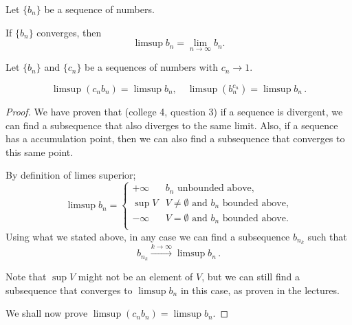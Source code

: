 \documentclass[week=11]{homework}
\date{\today}
\begin{document}
    \maketitle
    \thispagestyle{empty}
    \newpage
    \begin{questions}
		\let\firstquestion\question
		\renewcommand*{\question}{\vspace{7mm}\firstquestion}
        \firstquestion
		Let $\{b_n \}$ be a sequence of numbers. 
		\begin{toprove}
			If $\{b_n \}$ converges, then 
			\[
				\limsup b_n = \lim_{n \to \infty} b_n.
			\]
		\end{toprove}
		
		\question
		Let $\{b_n \}$ and $\{c_n \}$ be a sequences of numbers with $c_n \to 1$. 
		\begin{toprove}
			\[
				\limsup (c_n b_n) = \limsup b_n, \quad \limsup (b_n^{c_n}) = \limsup b_n\,.
			\]
		\end{toprove}
		\begin{proof}
			We have proven that (college 4, question 3) if a sequence is divergent, we can find a subsequence that also diverges to the same limit. Also, if a sequence has a accumulation point, then we can also find a subsequence that converges to this same point.
			
			By definition of limes superior;
			\[
				\limsup b_n = 
				\begin{cases}
					+\infty & b_n \text{ unbounded above,} \\
					\sup V & V \neq \emptyset \text{ and } b_n \text{ bounded above,} \\
					-\infty & V = \emptyset \text{ and } b_n \text{ bounded above.} \\
				\end{cases}
			\]
			Using what we stated above, in any case we can find a subsequence $b_{n_k}$ such that
			\begin{equation} \label{subsequence_to_limsup} \tag{$\star$}
				b_{n_k} \xrightarrow{k\to\infty} \limsup b_n\,.
			\end{equation}
			
			Note that $\sup V$ might not be an element of $V$, but we can still find a subsequence that converges to $\limsup b_n$ in this case, as proven in the lectures.
			
			We shall now prove $\limsup (c_n b_n) = \limsup b_n$.
\end{proof}
\end{questions}
\end{document}
